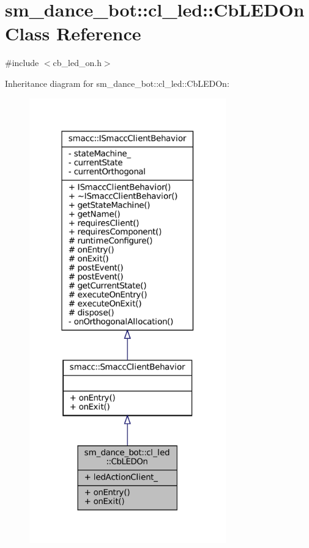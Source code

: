 \hypertarget{classsm__dance__bot_1_1cl__led_1_1CbLEDOn}{}\section{sm\+\_\+dance\+\_\+bot\+:\+:cl\+\_\+led\+:\+:Cb\+L\+E\+D\+On Class Reference}
\label{classsm__dance__bot_1_1cl__led_1_1CbLEDOn}


{\ttfamily \#include $<$cb\+\_\+led\+\_\+on.\+h$>$}



Inheritance diagram for sm\+\_\+dance\+\_\+bot\+:\+:cl\+\_\+led\+:\+:Cb\+L\+E\+D\+On\+:
\nopagebreak
\begin{figure}[H]
\begin{center}
\leavevmode
\includegraphics[width=241pt]{classsm__dance__bot_1_1cl__led_1_1CbLEDOn__inherit__graph}
\end{center}
\end{figure}


